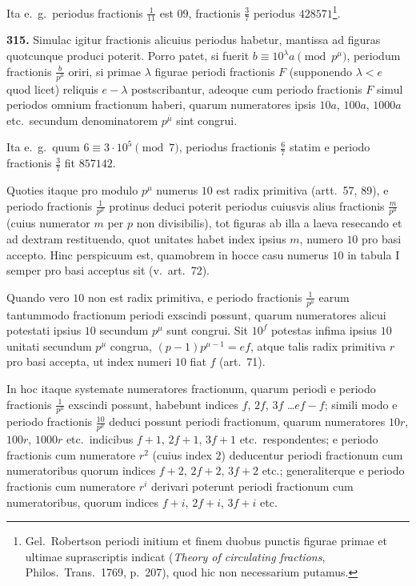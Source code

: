 \documentclass[12pt,a4paper]{article}
\theoremstyle{plain}
\theoremstyle{definition}
\theoremstyle{remark}
\begin{document}
Ita e.~g.~periodus fractionis $\frac{1}{11}$ est $09$, fractionis $\frac{3}{7}$ periodus $428571$\footnote{Gel.~Robertson periodi initium et finem duobus punctis figurae primae et ultimae suprascriptis indicat (\textit{Theory of circulating fractions}, Philos.~Trans.~1769, p.~207), quod hic non necessarium putamus.}.

\textbf{315.} Simulac igitur fractionis alicuius periodus habetur, mantissa ad figuras quotcunque produci poterit. Porro patet, si fuerit $b \equiv 10^\lambda a \pmod{p^\mu}$, periodum fractionis $\frac{b}{p^\mu}$ oriri, si primae $\lambda$ figurae periodi fractionis $F$ (supponendo $\lambda < e$ quod licet) reliquis $e-\lambda$ postscribantur, adeoque cum periodo fractionis $F$ simul periodos omnium fractionum haberi, quarum numeratores ipsis $10a$, $100a$, $1000a$ etc.~secundum denominatorem $p^\mu$ sint congrui.

Ita e.~g.~quum $6 \equiv 3 \cdot 10^5 \pmod{7}$, periodus fractionis $\frac{6}{7}$ statim e periodo fractionis $\frac{3}{7}$ fit $857142$.

Quoties itaque pro modulo $p^\mu$ numerus $10$ est radix primitiva (artt.~57, 89), e periodo fractionis $\frac{1}{p^\mu}$ protinus deduci poterit periodus cuiusvis alius fractionis $\frac{m}{p^\mu}$ (cuius numerator $m$ per $p$ non divisibilis), tot figuras ab illa a laeva resecando et ad dextram restituendo, quot unitates habet index ipsius $m$, numero $10$ pro basi accepto. Hinc perspicuum est, quamobrem in hocce casu numerus $10$ in tabula I semper pro basi acceptus sit (v.~art.~72).

Quando vero $10$ non est radix primitiva, e periodo fractionis $\frac{1}{p^\mu}$ earum tantummodo fractionum periodi exscindi possunt, quarum numeratores alicui potestati ipsius $10$ secundum $p^\mu$ sunt congrui. Sit $10^f$ potestas infima ipsius $10$ unitati secundum $p^\mu$ congrua, $(p-1)p^{\mu-1} = ef$, atque talis radix primitiva $r$ pro basi accepta, ut index numeri $10$ fiat $f$ (art.~71).

In hoc itaque systemate numeratores fractionum, quarum periodi e periodo fractionis $\frac{1}{p^\mu}$ exscindi possunt, habebunt indices $f$, $2f$, $3f$ \ldots $ef-f$; simili modo e periodo fractionis $\frac{10}{p^\mu}$ deduci possunt periodi fractionum, quarum numeratores $10r$, $100r$, $1000r$ etc.~indicibus $f+1$, $2f+1$, $3f+1$ etc.~respondentes; e periodo fractionis cum numeratore $r^2$ (cuius index $2$) deducentur periodi fractionum cum numeratoribus quorum indices $f+2$, $2f+2$, $3f+2$ etc.; generaliterque e periodo fractionis cum numeratore $r^i$ derivari poterunt periodi fractionum cum numeratoribus, quorum indices $f+i$, $2f+i$, $3f+i$ etc.
\end{document}
